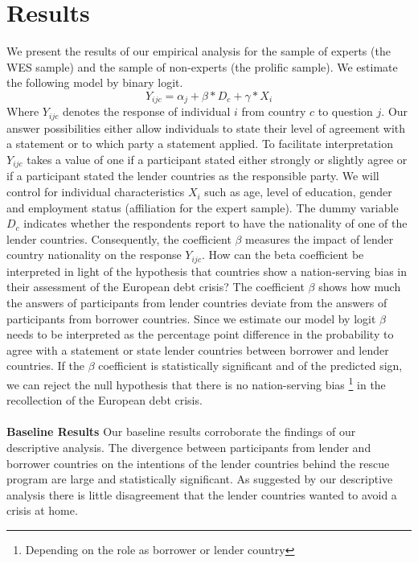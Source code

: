 \clearpage
\section{Results}
We present the results of our empirical analysis for the sample of experts (the WES sample) and the sample of non-experts (the prolific sample).  We estimate the following model by binary logit. 
\begin{equation*}
    Y_{ijc}= \alpha_{j}+ \beta *D_{c} + \gamma*X_{i}
\end{equation*}
Where $Y_{ijc}$ denotes the response of individual $i$ from country $c$ to question $j$. Our answer possibilities either allow individuals to state their level of agreement with a statement or to which party a statement applied. To facilitate interpretation  $Y_{ijc}$ takes a value of one if a participant stated either strongly or slightly agree or if a participant stated the lender countries as the responsible party. We will control for individual characteristics $X_{i}$ such as age, level of education, gender and employment status (affiliation for the expert sample). The dummy variable $D_{c}$ indicates whether the respondents report to have the nationality of one of the lender countries. Consequently, the coefficient $\beta$ measures the impact of lender country nationality on the response $Y_{ijc}$. How can the beta coefficient be interpreted in light of the hypothesis that countries show a nation-serving bias in their assessment of the European debt crisis?  The coefficient $\beta$ shows how much the answers of participants from lender countries deviate from the answers of participants from borrower countries. Since we estimate our model by logit $\beta$ needs to be interpreted as the percentage point difference  in the probability to agree with a statement or state lender countries between borrower and lender countries. If the $\beta$ coefficient is statistically significant and of the predicted sign, we can reject the null hypothesis that there is no nation-serving bias \footnote{Depending on the role as borrower or lender country} in the recollection of the European debt crisis. 
\\ \\
\textbf{Baseline Results} 
Our baseline results corroborate the findings of our descriptive analysis. The divergence between participants from lender and borrower countries on the intentions of the lender countries behind the rescue program are large and statistically significant. As suggested by our descriptive analysis there is little disagreement that the lender countries wanted to avoid a crisis at home.  \\ 
